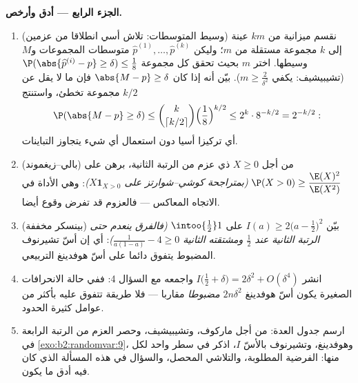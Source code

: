 \begin{problem}
\medskip
\noindent\textbf{الجزء الرابع --- أدق وأرخص.}
\begin{enumerate}[resume]
  \item (وسيط المتوسطات: تلاش أسي انطلاقا من عزمين) نقسم ميزانية
        من $km$ عينة إلى $k$ مجموعة مستقلة من $m$؛ وليكن
        $\widehat p^{(1)}, \dots, \widehat
        p^{(k)}$ متوسطات المجموعات و$M$ وسيطها. اختر $m$ بحيث
        تحقق كل مجموعة $\P(\abs{\widehat p^{(i)} - p} \geq \delta) \leq
        \frac18$ (تشيبيشيف: يكفي $m \geq \frac2{\delta^2}$). بيّن أنه إذا
        كان $\abs{M - p} \geq \delta$ فإن ما لا يقل عن $k/2$ مجموعة تخطئ، واستنتج
        \[
        \P(\abs{M - p} \geq \delta)
        \leq \binom{k}{\lceil k/2\rceil}\Bigl(\frac18
        \Bigr)^{k/2}
        \leq 2^k\cdot 8^{-k/2} = 2^{-k/2} :
        \]
        أي تركيزا أسيا دون استعمال أي شيء يتجاوز التباينات.
  \item (بالي--زيغموند) من أجل $X \geq 0$ ذي عزم من الرتبة الثانية،
        برهن على $\P(X > 0) \geq \dfrac{\E(X)^2}{\E(X^2)}$ \emph{(بمتراجحة كوشي--شوارتز على $X\mathbf 1_{X>0}$)}:
        وهي الأداة في الاتجاه المعاكس --- فالعزوم قد تفرض وقوع
         أيضا.
  \item (بينسكر مخففة) بيّن $I(a) \geq 2\bigl(a -
        \tfrac12\bigr)^2$ على $\intoo{\frac12}1$ \emph{(فالفرق ينعدم
        حتى الرتبة الثانية عند $\frac12$ ومشتقته الثانية $\frac1{a(1-a)} - 4 \geq
        0$)}: أي
        إن أسّ تشيرنوف المضبوط يتفوق دائما على أسّ هوفدينغ التربيعي.
  \item انشر $I\bigl(\tfrac12 + \delta\bigr) = 2\delta^2 +
        O(\delta^4)$ واجمعه مع السؤال 4: ففي حالة الانحرافات
        الصغيرة يكون أسّ هوفدينغ $2n\delta^2$ \emph{مضبوطا} مقاربا ---
        فلا طريقة تتفوق عليه بأكثر من عوامل كثيرة الحدود.
  \item ارسم جدول العدة: من أجل ماركوف، وتشيبيشيف، وحصر العزم من
        الرتبة الرابعة في \cref{exo:b2:randomvar:9}، وهوفدينغ، وتشيرنوف بالأسّ $I$،
        اذكر في سطر واحد لكل منها: الفرضية المطلوبة، والتلاشي
        المحصل، والسؤال في هذه المسألة الذي كان فيه أدق ما يكون.
\end{enumerate}


\end{problem}

